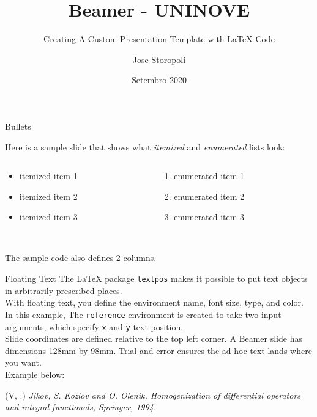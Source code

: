 \documentclass[10pt, xcolor=dvipsnames]{beamer}
\title{Beamer - UNINOVE}
\subtitle{Creating A Custom Presentation Template with \LaTeX{} Code}
\author{Jose Storopoli}
\institute[Cidades Inteligentes e Sustentáveis]{
   \textcolor{QPblue!75}{Universidade Nove de Julho \\
   UNINOVE \\
   São Paulo \\ 
   Brasil \\ [1ex]
   \texttt{josees@uni9.pro.br}}
}
\date{Setembro 2020}
\newenvironment{reference}[2]{                                    %
  \begin{textblock*}{\textwidth}(#1, #2)
      \tiny\it\bgroup\color{red!70!QPblue}}{\egroup\end{textblock*}}
\begin{document}
 
\begin{frame}[plain]
  \titlepage
\end{frame}

 
\begin{frame}{Bullets}
 
Here is a sample slide that shows what \emph{itemized} and \emph{enumerated} lists look:  
 
\begin{columns}
  \begin{column}{0.45\textwidth}
  \begin{itemize}
    \item itemized item 1
    \item itemized item 2
    \item itemized item 3
  \end{itemize}
  \end{column}
 
  \begin{column}{0.45\textwidth}
  \begin{enumerate}
    \item enumerated item 1
    \item enumerated item 2
    \item enumerated item 3
  \end{enumerate}
  \end{column}
\end{columns}
~\\[2ex]
 
The sample code also defines 2 columns.
 
\end{frame}

 
\begin{frame}{Floating Text} 
The \LaTeX{} package \texttt{textpos} makes it possible to put text objects in arbitrarily prescribed places.\\[2ex]
 
With floating text, you define the environment name, font size, type, and color.\\[2ex]
 
In this example, The \texttt{reference} environment is created to take two input arguments, which specify \texttt{x} and \texttt{y} text position.\\[2ex]  
 
Slide coordinates are defined relative to the top left corner.  A Beamer slide has dimensions 128mm by 98mm.  Trial and error ensures the ad-hoc text lands where you want.\\[2ex]
 
Example below:
 
\begin{reference}{4mm}{75mm}
      V. Jikov, S. Kozlov and O. Olenik, Homogenization of differential operators and integral functionals, Springer, 1994.
\end{reference} 
\end{frame}
 
 
\end{document}
